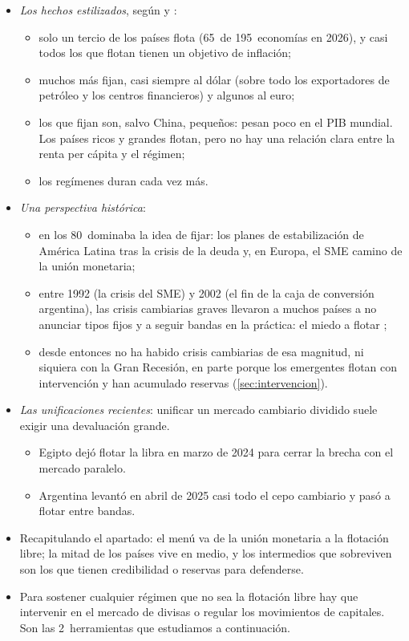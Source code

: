\documentclass[11pt]{article}
\begin{document}
\begin{itemize}
\item \emph{Los hechos estilizados}, según \textcite{Rose2011Flaky} y \textcite{KleinShambaugh2010Exchange}:
  \begin{itemize}
  \item solo un tercio de los países flota (65~de 195~economías en 2026), y casi todos los que flotan tienen un objetivo de inflación\nocite{FMI2026InformeAnual};
  \item muchos más fijan, casi siempre al dólar (sobre todo los exportadores de petróleo y los centros financieros) y algunos al euro;
  \item los que fijan son, salvo China, pequeños: pesan poco en el PIB mundial. Los países ricos y grandes flotan, pero no hay una relación clara entre la renta per cápita y el régimen;
  \item los regímenes duran cada vez más.
  \end{itemize}
\item \emph{Una perspectiva histórica}:
  \begin{itemize}
  \item en los 80~dominaba la idea de fijar: los planes de estabilización de América Latina tras la crisis de la deuda y, en Europa, el SME camino de la unión monetaria;
  \item entre 1992 (la crisis del SME) y 2002 (el fin de la caja de conversión argentina), las crisis cambiarias graves llevaron a muchos países a no anunciar tipos fijos y a seguir bandas en la práctica: el miedo a flotar ;
  \item desde entonces no ha habido crisis cambiarias de esa magnitud, ni siquiera con la Gran Recesión, en parte porque los emergentes flotan con intervención y han acumulado reservas (\ref{sec:intervencion}).
  \end{itemize}
\item \emph{Las unificaciones recientes}: unificar un mercado cambiario dividido suele exigir una devaluación grande.
  \begin{itemize}
  \item Egipto dejó flotar la libra en marzo de 2024 para cerrar la brecha con el mercado paralelo\nocite{CBE2024Flotacion}.
  \item Argentina levantó en abril de 2025 casi todo el cepo cambiario y pasó a flotar entre bandas\nocite{BCRA2025Fase3,FMI2025ArgentinaEFF}.
  \end{itemize}
\item Recapitulando el apartado: el menú va de la unión monetaria a la flotación libre; la mitad de los países vive en medio, y los intermedios que sobreviven son los que tienen credibilidad o reservas para defenderse.
\item Para sostener cualquier régimen que no sea la flotación libre hay que intervenir en el mercado de divisas o regular los movimientos de capitales. Son las 2~herramientas que estudiamos a continuación.
\end{itemize}
\end{document}

